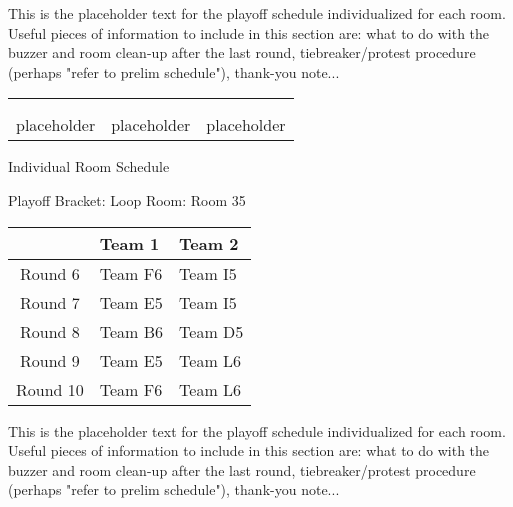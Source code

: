\documentclass{article}%
\begin{document}
\vspace*{16pt}%
\linebreak%
This is the placeholder text for the playoff schedule individualized for each room. Useful pieces of information to include in this section are: what to do with the buzzer and room clean{-}up after the last round, tiebreaker/protest procedure (perhaps "refer to prelim schedule"), thank{-}you note...%
\vspace*{30pt}%
\newline%
%
\begin{tabularx}{\textwidth}{YYY}%
  &  &  \\%
\\%
placeholder&placeholder&placeholder\\%
\end{tabularx}%
\newpage%
\begin{center}%
\begin{Huge}%
Individual Room Schedule%
\end{Huge}%
\vspace*{16pt}%
\linebreak%
\begin{Large}%
Playoff Bracket: Loop \hfill Room: Room 35%
\end{Large}%
\end{center}%
%
\begin{tabularx}{\textwidth}{|c|Y|Y|}%
\hline%
&Team 1&Team 2\\%
\hline%
Round 6&Team F6&Team I5\\%
Round 7&Team E5&Team I5\\%
Round 8&Team B6&Team D5\\%
Round 9&Team E5&Team L6\\%
Round 10&Team F6&Team L6\\%
\hline%
\end{tabularx}%
\vspace*{16pt}%
\linebreak%
This is the placeholder text for the playoff schedule individualized for each room. Useful pieces of information to include in this section are: what to do with the buzzer and room clean{-}up after the last round, tiebreaker/protest procedure (perhaps "refer to prelim schedule"), thank{-}you note...%
\vspace*{30pt}%
\newline%
\end{document}

